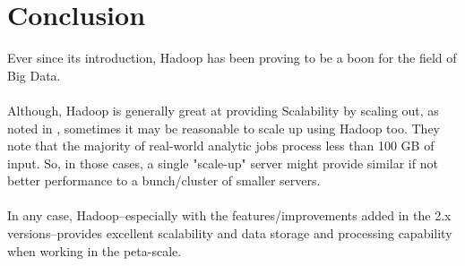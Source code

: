 \documentclass[a4paper,12pt,oneside]{report}
\begin{document}
\newpage
\section{Conclusion}
Ever since its introduction, Hadoop has been proving to be a boon for the field of Big Data.\\ 
\\
Although, Hadoop is generally great at providing Scalability by scaling out, as noted in \cite{Appuswamy2013}, sometimes it may be 
reasonable to scale up using Hadoop too. They note that the majority of real-world analytic jobs process less than 100 GB of input. 
So, in those cases, a single "scale-up" server might provide similar if not better performance to a bunch/cluster of smaller servers.\\
\\
In any case, Hadoop--especially with the features/improvements added in the 2.x versions--provides excellent scalability and data storage and processing
capability when working in the peta-scale.
\end{document}
